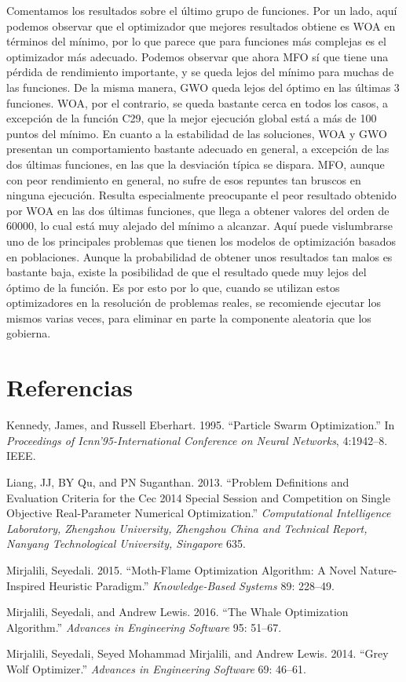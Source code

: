 \documentclass[
  a4paper,
,tablecaptionabove
]{scrartcl}
\begin{document}
Comentamos los resultados sobre el último grupo de funciones. Por un
lado, aquí podemos observar que el optimizador que mejores resultados
obtiene es WOA en términos del mínimo, por lo que parece que para
funciones más complejas es el optimizador más adecuado. Podemos observar
que ahora MFO sí que tiene una pérdida de rendimiento importante, y se
queda lejos del mínimo para muchas de las funciones. De la misma manera,
GWO queda lejos del óptimo en las últimas 3 funciones. WOA, por el
contrario, se queda bastante cerca en todos los casos, a excepción de la
función C29, que la mejor ejecución global está a más de 100 puntos del
mínimo. En cuanto a la estabilidad de las soluciones, WOA y GWO
presentan un comportamiento bastante adecuado en general, a excepción de
las dos últimas funciones, en las que la desviación típica se dispara.
MFO, aunque con peor rendimiento en general, no sufre de esos repuntes
tan bruscos en ninguna ejecución. Resulta especialmente preocupante el
peor resultado obtenido por WOA en las dos últimas funciones, que llega
a obtener valores del orden de 60000, lo cual está muy alejado del
mínimo a alcanzar. Aquí puede vislumbrarse uno de los principales
problemas que tienen los modelos de optimización basados en poblaciones.
Aunque la probabilidad de obtener unos resultados tan malos es bastante
baja, existe la posibilidad de que el resultado quede muy lejos del
óptimo de la función. Es por esto por lo que, cuando se utilizan estos
optimizadores en la resolución de problemas reales, se recomiende
ejecutar los mismos varias veces, para eliminar en parte la componente
aleatoria que los gobierna.

\hypertarget{referencias}{%
\section*{Referencias}\label{referencias}}

\hypertarget{refs}{}
\leavevmode\hypertarget{ref-kennedy1995particle}{}%
Kennedy, James, and Russell Eberhart. 1995. ``Particle Swarm
Optimization.'' In \emph{Proceedings of Icnn'95-International Conference
on Neural Networks}, 4:1942--8. IEEE.

\leavevmode\hypertarget{ref-liang2013problem}{}%
Liang, JJ, BY Qu, and PN Suganthan. 2013. ``Problem Definitions and
Evaluation Criteria for the Cec 2014 Special Session and Competition on
Single Objective Real-Parameter Numerical Optimization.''
\emph{Computational Intelligence Laboratory, Zhengzhou University,
Zhengzhou China and Technical Report, Nanyang Technological University,
Singapore} 635.

\leavevmode\hypertarget{ref-mirjalili2015moth}{}%
Mirjalili, Seyedali. 2015. ``Moth-Flame Optimization Algorithm: A Novel
Nature-Inspired Heuristic Paradigm.'' \emph{Knowledge-Based Systems} 89:
228--49.

\leavevmode\hypertarget{ref-mirjalili2016whale}{}%
Mirjalili, Seyedali, and Andrew Lewis. 2016. ``The Whale Optimization
Algorithm.'' \emph{Advances in Engineering Software} 95: 51--67.

\leavevmode\hypertarget{ref-mirjalili2014grey}{}%
Mirjalili, Seyedali, Seyed Mohammad Mirjalili, and Andrew Lewis. 2014.
``Grey Wolf Optimizer.'' \emph{Advances in Engineering Software} 69:
46--61.
\end{document}
